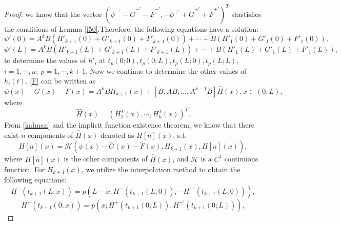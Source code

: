 \documentclass[a4paper,reqno,11pt]{amsart}
\numberwithin{equation}{section} %
\begin{document}
\begin{proof}
we know that the vector $(\psi ^{-\prime}-\tilde{G}^{-\prime}-\tilde{F}^{-\prime},-\psi ^{+\prime}+\tilde{G}^{+\prime}+\tilde{F}^{+\prime})^T$ stastisfies the conditions of Lemma \ref{l50}.Therefore, the following equations have a solution:
\begin{equation}\label{c1 continuity at 0}
	\psi  '\left( 0 \right)=A^kB(H'_{k+1}\left( 0\right)+G'_{k+1}\left( 0 \right)+F'_{k+1}\left( 0 \right)) +\cdots + B(H'_1\left( 0 \right)+G'_1\left( 0 \right)+F'_1\left( 0 \right)) ,
\end{equation}
\begin{equation}\label{c1 continuity at L}
	\psi  '\left( L \right)=A^kB(H'_{k+1}\left( L \right)+G'_{k+1}\left( L \right)+F'_{k+1}\left( L \right)) +\cdots + B(H'_1\left( L \right)+G'_1\left( L \right)+F'_1\left( L \right)) ,
\end{equation}
to determine the values of $h'_i$ at $t_p(0;0),t_p(0;L),t_p(L;0),t_p(L;L)$,$i=1,\cdots,n;\ p=1,\cdots,k+1$.
Now we continue to determine the other values of $h_i(t)$. \eqref{F} can be written as
\begin{equation}\label{G}
\psi \left( x \right) -\tilde{G}\left( x \right) -\tilde{F}\left( x \right) =A^kBH_{k+1}\left( x \right) +\left[ B,AB,...,A^{k-1}B \right] \hat{H}(x), x\in \left( 0,L \right) ,
\end{equation}
where 
$$
\hat{H}(x)=\left( H^T_1\left( x \right) ,\cdots ,H^T_k\left( x \right) \right)^T .
$$
From \eqref{kalman} and the implicit function existence theorem, we know that there exist $n$ components of $\hat{H}(x)$ denoted as $H[n](x) $, s.t.
\begin{equation}\label{H}
H\left[ n \right] \left( x \right) =\mathcal{H} \left( \psi \left( x \right) -\tilde{G}\left( x \right) -\tilde{F}\left( x \right) ,H_{k+1}\left( x \right) ,H\left[ \hat{n} \right] \left( x \right) \right) ,
\end{equation}
where $H\left[ \hat{n} \right] \left( x \right)$ is the other components of $\hat{H}(x)$, and $\mathcal{H}$ is a $C^1$ continuous function. For $H_{k+1}\left( x \right) $, we utilize the interpolation method to obtain the following equations:
\begin{equation}\label{polynomial k+1 r}
H^-\left( t_{k+1}\left( L;x \right) \right) =p\left( L-x;H^-\left( t_{k+1}\left( L;0 \right) \right) ,-H^{- \prime}\left( t_{k+1}\left( L;0 \right) \right) \right) ,
\end{equation}
\begin{equation}\label{polynomial k+1 s}
	H^+\left( t_{k+1}\left( 0;x \right) \right) =p\left( x;H^+\left( t_{k+1}\left( 0;L \right) \right) ,H^{+ \prime}\left( t_{k+1}\left( 0;L \right) \right) \right) ,

\end{equation}
\end{proof}
\end{document}
